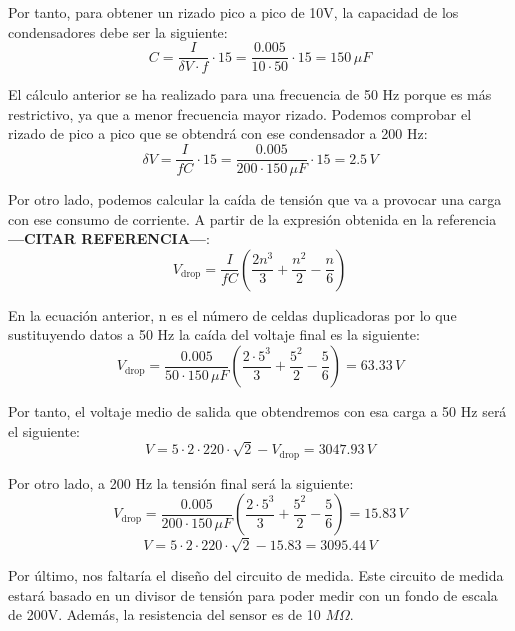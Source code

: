 Por tanto, para obtener un rizado pico a pico de 10V, la capacidad de los condensadores debe 
ser la siguiente:
\begin{equation}
    C = \frac{I}{\delta V\cdot f}\cdot15 = \frac{0.005}{10\cdot 50}\cdot 15 = 150\,\mu F
\end{equation}

El cálculo anterior se ha realizado para una frecuencia de 50 Hz porque es más restrictivo, 
ya que a menor frecuencia mayor rizado. Podemos comprobar el rizado de pico a pico que se obtendrá con ese condensador 
a 200 Hz:
\begin{equation}
    \delta V = \frac{I}{fC}\cdot15 = \frac{0.005}{200\cdot 150\,\mu F}\cdot15 = 2.5\,V
\end{equation}

Por otro lado, podemos calcular la caída de tensión que va a provocar una carga con ese 
consumo de corriente. A partir de la expresión obtenida en la referencia \textbf{---CITAR REFERENCIA---}:
\begin{equation}
    V_{\text{drop}} = \frac{I}{fC}\left(\frac{2n^3}{3}+\frac{n^2}{2}-\frac{n}{6}\right)
\end{equation}

En la ecuación anterior, n es el número de celdas duplicadoras por lo que sustituyendo datos a 50 Hz 
la caída del voltaje final es la siguiente:
\begin{equation}
    V_{\text{drop}} = \frac{0.005}{50\cdot 150\,\mu F}\left(\frac{2\cdot5^3}{3}+\frac{5^2}{2}-\frac{5}{6}\right) = 63.33\,V
\end{equation}

Por tanto, el voltaje medio de salida que obtendremos con esa carga a 50 Hz será el siguiente:
\begin{equation}
    V = 5\cdot2\cdot220\cdot\sqrt{2}-V_{\text{drop}} = 3047.93\,V
\end{equation}

Por otro lado, a 200 Hz la tensión final será la siguiente:
\begin{equation}
    V_{\text{drop}} = \frac{0.005}{200\cdot 150\,\mu F}\left(\frac{2\cdot5^3}{3}+\frac{5^2}{2}-\frac{5}{6}\right) = 15.83\,V
\end{equation}
\begin{equation}
    V = 5\cdot2\cdot220\cdot\sqrt{2}-15.83= 3095.44\,V
\end{equation}

Por último, nos faltaría el diseño del circuito de medida. Este circuito de medida estará basado en 
un divisor de tensión para poder medir con un fondo de escala de 200V. Además, la resistencia 
del sensor es de 10 $M\Omega$. 

